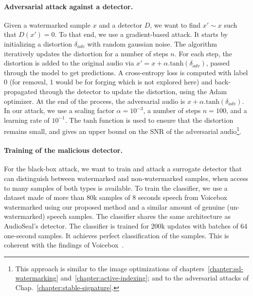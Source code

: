 \paragraph{Adversarial attack against a detector.}
Given a watermarked sample $x$ and a detector $D$, we want to find $x' \sim x$ such that $D(x') = 0$.
To that end, we use a gradient-based attack.
It starts by initializing a distortion $\delta_{adv}$ with random gaussian noise.
The algorithm iteratively updates the distortion for a number of steps $n$. 
For each step, the distortion is added to the original audio via $ x' = x + \alpha . \mathrm{tanh} (\delta_{adv})$, passed through the model to get predictions. 
A cross-entropy loss is computed with label 0 (for removal, 1 would be for forging which is not explored here) and back-propagated through the detector to update the distortion, using the Adam optimizer.
At the end of the process, the adversarial audio is $x + \alpha . \mathrm{tanh} (\delta_{adv})$.
In our attack, we use a scaling factor $\alpha=10^{-3}$, a number of steps $n=100$, and a learning rate of $10^{-1}$. 
The $\mathrm{tanh}$ function is used to ensure that the distortion remains small, and gives an upper bound on the SNR of the adversarial audio\footnote{
    This approach is similar to the image optimizations of chapters~\ref{chapter:ssl-watermarking} and~\ref{chapter:active-indexing}; and to the adversarial attacks of Chap.~\ref{chapter:stable-signature}.
}.

\paragraph{Training of the malicious detector.}
For the black-box attack, we want to train and attack a surrogate detector that can distinguish between watermarked and non-watermarked samples, when access to many samples of both types is available.
To train the classifier, we use a dataset made of more than 80k samples of 8 seconds speech from Voicebox~\citep{le2023voicebox} watermarked using our proposed method and a similar amount of genuine (un-watermarked) speech samples. 
The classifier shares the same architecture as AudioSeal's detector. 
The classifier is trained for 200k updates with batches of 64 one-second samples. 
It achieves perfect classification of the samples. 
This is coherent with the findings of Voicebox~\citep{le2023voicebox}.



